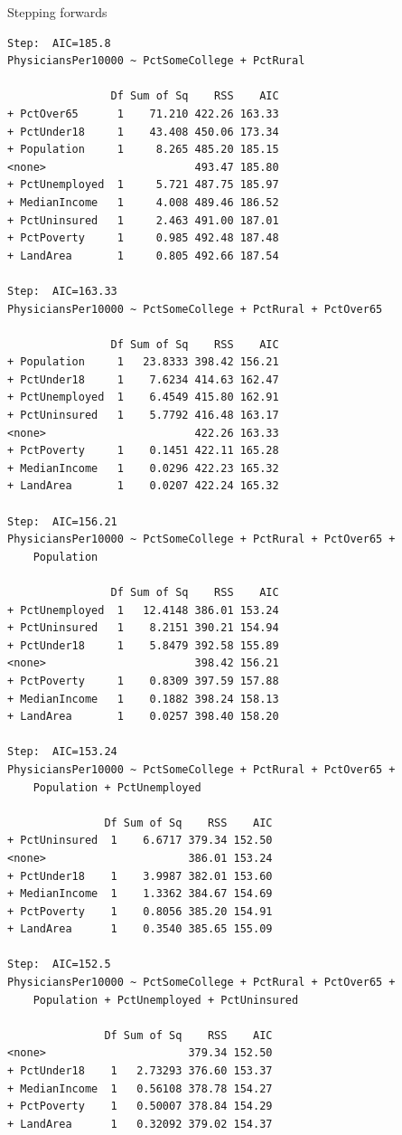 \documentclass{beamer}\usepackage[]{graphicx}\usepackage[]{color}
\makeatletter
\newenvironment{kframe}{%
 \def\at@end@of@kframe{}%
 \ifinner\ifhmode%
  \def\at@end@of@kframe{\end{minipage}}%
  \begin{minipage}{\columnwidth}%
 \fi\fi%
 \def\FrameCommand##1{\hskip\@totalleftmargin \hskip-\fboxsep
 \colorbox{shadecolor}{##1}\hskip-\fboxsep
     \hskip-\linewidth \hskip-\@totalleftmargin \hskip\columnwidth}%
 \MakeFramed {\advance\hsize-\width
   \@totalleftmargin\z@ \linewidth\hsize
   \@setminipage}}%
 {\par\unskip\endMakeFramed%
 \at@end@of@kframe}
\newenvironment{knitrout}{}{} %
\makeatother
\begin{document}
\begin{darkframes}
\begin{frame}[fragile]{Stepping forwards}
\begin{knitrout}
\begin{kframe}
\begin{verbatim}
Step:  AIC=185.8
PhysiciansPer10000 ~ PctSomeCollege + PctRural

                Df Sum of Sq    RSS    AIC
+ PctOver65      1    71.210 422.26 163.33
+ PctUnder18     1    43.408 450.06 173.34
+ Population     1     8.265 485.20 185.15
<none>                       493.47 185.80
+ PctUnemployed  1     5.721 487.75 185.97
+ MedianIncome   1     4.008 489.46 186.52
+ PctUninsured   1     2.463 491.00 187.01
+ PctPoverty     1     0.985 492.48 187.48
+ LandArea       1     0.805 492.66 187.54

Step:  AIC=163.33
PhysiciansPer10000 ~ PctSomeCollege + PctRural + PctOver65

                Df Sum of Sq    RSS    AIC
+ Population     1   23.8333 398.42 156.21
+ PctUnder18     1    7.6234 414.63 162.47
+ PctUnemployed  1    6.4549 415.80 162.91
+ PctUninsured   1    5.7792 416.48 163.17
<none>                       422.26 163.33
+ PctPoverty     1    0.1451 422.11 165.28
+ MedianIncome   1    0.0296 422.23 165.32
+ LandArea       1    0.0207 422.24 165.32

Step:  AIC=156.21
PhysiciansPer10000 ~ PctSomeCollege + PctRural + PctOver65 + 
    Population

                Df Sum of Sq    RSS    AIC
+ PctUnemployed  1   12.4148 386.01 153.24
+ PctUninsured   1    8.2151 390.21 154.94
+ PctUnder18     1    5.8479 392.58 155.89
<none>                       398.42 156.21
+ PctPoverty     1    0.8309 397.59 157.88
+ MedianIncome   1    0.1882 398.24 158.13
+ LandArea       1    0.0257 398.40 158.20

Step:  AIC=153.24
PhysiciansPer10000 ~ PctSomeCollege + PctRural + PctOver65 + 
    Population + PctUnemployed

               Df Sum of Sq    RSS    AIC
+ PctUninsured  1    6.6717 379.34 152.50
<none>                      386.01 153.24
+ PctUnder18    1    3.9987 382.01 153.60
+ MedianIncome  1    1.3362 384.67 154.69
+ PctPoverty    1    0.8056 385.20 154.91
+ LandArea      1    0.3540 385.65 155.09

Step:  AIC=152.5
PhysiciansPer10000 ~ PctSomeCollege + PctRural + PctOver65 + 
    Population + PctUnemployed + PctUninsured

               Df Sum of Sq    RSS    AIC
<none>                      379.34 152.50
+ PctUnder18    1   2.73293 376.60 153.37
+ MedianIncome  1   0.56108 378.78 154.27
+ PctPoverty    1   0.50007 378.84 154.29
+ LandArea      1   0.32092 379.02 154.37
\end{verbatim}
\end{kframe}
\end{knitrout}


\end{frame}
\end{darkframes}
\end{document}
